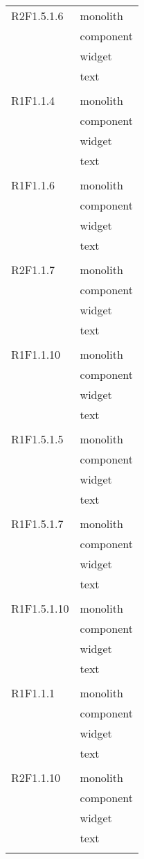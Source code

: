 \begin{center}
\begin{longtable}{|p{7cm}|p{7cm}|}
		R2F1.5.1.6 & monolith \\ & component \\ & widget \\ & text \\ & \\ \hline
		R1F1.1.4 & monolith \\ & component \\ & widget \\ & text \\ & \\ \hline
		R1F1.1.6 & monolith \\ & component \\ & widget \\ & text \\ & \\ \hline
		R2F1.1.7 & monolith \\ & component \\ & widget \\ & text \\ & \\ \hline
		R1F1.1.10 & monolith \\ & component \\ & widget \\ & text \\ & \\ \hline
		R1F1.5.1.5 & monolith \\ & component \\ & widget \\ & text \\ & \\ \hline
		R1F1.5.1.7 & monolith \\ & component \\ & widget \\ & text \\ & \\ \hline
		R1F1.5.1.10 & monolith \\ & component \\ & widget \\ & text \\ & \\ \hline
		R1F1.1.1 & monolith \\ & component \\ & widget \\ & text \\ & \\ \hline
		R2F1.1.10 & monolith \\ & component \\ & widget \\ & text \\ & \\ \hline

\end{longtable}
\end{center}
